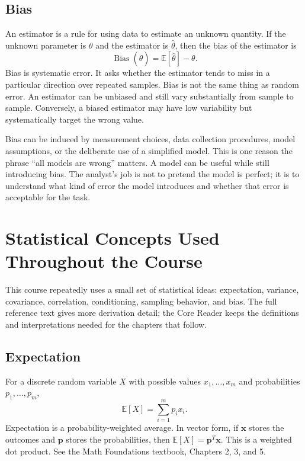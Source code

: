 {\subsection{Bias}

An estimator is a rule for using data to estimate an unknown quantity.  If the unknown parameter is $\theta$ and the estimator is $\hat{\theta}$, then the bias of the estimator is
\begin{equation}
  \operatorname{Bias}(\hat{\theta})
  = \mathbb{E}[\hat{\theta}] - \theta.
  \label{eq:bias-definition}
\end{equation}
Bias is systematic error.  It asks whether the estimator tends to miss in a particular direction over repeated samples.  Bias is not the same thing as random error.  An estimator can be unbiased and still vary substantially from sample to sample.  Conversely, a biased estimator may have low variability but systematically target the wrong value.

Bias can be induced by measurement choices, data collection procedures, model assumptions, or the deliberate use of a simplified model.  This is one reason the phrase ``all models are wrong'' matters.  A model can be useful while still introducing bias.  The analyst's job is not to pretend the model is perfect; it is to understand what kind of error the model introduces and whether that error is acceptable for the task.
}{
\section{Statistical Concepts Used Throughout the Course}

This course repeatedly uses a small set of statistical ideas: expectation, variance, covariance, correlation, conditioning, sampling behavior, and bias.  The full reference text gives more derivation detail; the Core Reader keeps the definitions and interpretations needed for the chapters that follow.

\subsection{Expectation}

For a discrete random variable $X$ with possible values $x_1,\ldots,x_m$ and probabilities $p_1,\ldots,p_m$,
\begin{equation}
  \mathbb{E}[X]=\sum_{i=1}^m p_i x_i.
\end{equation}
Expectation is a probability-weighted average.  In vector form, if $\mathbf{x}$ stores the outcomes and $\mathbf{p}$ stores the probabilities, then $\mathbb{E}[X]=\mathbf{p}^T\mathbf{x}$.  This is a weighted dot product.  See the Math Foundations textbook, Chapters 2, 3, and 5.

}
